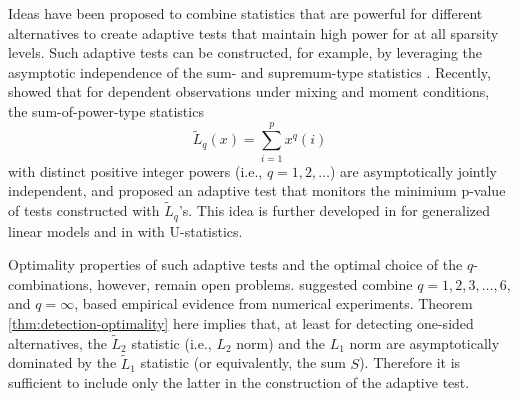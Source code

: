 Ideas have been proposed to combine statistics that are powerful for different alternatives to create adaptive tests that maintain high power for at all sparsity levels.
Such adaptive tests can be constructed, for example, by leveraging the asymptotic independence of the sum- and supremum-type statistics \citep{hsing1995note}. 
Recently, \citet{xu2016adaptive} showed that for dependent observations under mixing and moment conditions, the sum-of-power-type statistics
\begin{equation}
    \widetilde{L}_q(x) = \sum_{i=1}^p x^q(i)
\end{equation} 
with distinct positive integer powers (i.e., $q=1,2,\ldots$) are asymptotically jointly independent, and proposed an adaptive test that monitors the minimium p-value of tests constructed with $\tilde{L}_q$'s.
This idea is further developed in \cite{wu2019adaptive} for generalized linear models and in \cite{he2018asymptotically} with U-statistics.

Optimality properties of such adaptive tests and the optimal choice of the $q$-combinations, however, remain open problems.
\cite{xu2016adaptive} suggested combine $q=1, 2, 3, \ldots, 6$, and  $q=\infty$, based empirical evidence from numerical experiments. 
Theorem \ref{thm:detection-optimality} here implies that, at least for detecting one-sided alternatives, the $\widetilde{L}_2$ statistic (i.e., $L_2$ norm) and the $L_1$ norm are asymptotically dominated by the $\widetilde{L}_1$ statistic (or equivalently, the sum $S$). Therefore it is sufficient to include only the latter in the construction of the adaptive test. 







